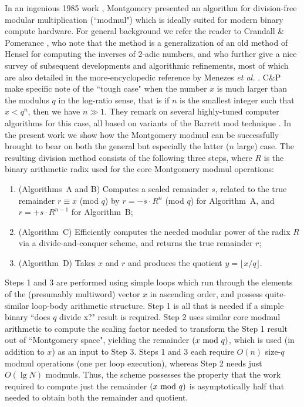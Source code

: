 \documentclass{article}
\begin{document}
In an ingenious 1985 work \cite{Mont85}, Montgomery presented an algorithm for division-free modular multiplication (``modmul") which is ideally suited for modern binary compute hardware. For general background we refer the reader to Crandall \& Pomerance \cite{CP05}, who note that the method is a generalization of an old method of Hensel \cite{Hensel} for computing the inverses of 2-adic numbers, and who further give a nice survey of subsequent developments and algorithmic refinements, most of which are also detailed in the more-encyclopedic reference by Menezes {\em et al.} \cite{Mene96}. C\&P make specific note of the ``tough case" when the number $x$ is much larger than the modulus $q$ in the log-ratio sense, that is if $n$ is the smallest integer such that $x < q^n$, then we have $n \gg 1$. They remark on several highly-tuned computer algorithms for this case, all based on variants of the Barrett mod technique \cite{Bar87}. In the present work we show how the Montgomery modmul can be successfully brought to bear on both the general but especially the latter ($n$ large) case. The resulting division method consists of the following three steps, where $R$ is the binary arithmetic radix used for the core Montgomery modmul operations:
\begin{enumerate}
\item 	(Algorithms~A and B) Computes a scaled remainder $s$, related to the true remainder $r \equiv x$ (mod $q$) by $r = -s \cdot R^n$ (mod $q$) for Algorithm~A, and $r = +s \cdot R^{n-1}$ for Algorithm~B;

\item	(Algorithm~C) Efficiently computes the needed modular power of the radix $R$ via a divide-and-conquer scheme, and returns the true remainder $r$;

\item	(Algorithm~D) Takes $x$ and $r$ and produces the quotient $y = \lfloor x/q \rfloor$.
\end{enumerate}
Steps 1 and 3 are performed using simple loops which run through the elements of the (presumably multiword) vector $x$ in ascending order, and possess quite-similar loop-body arithmetic structure. Step 1 is all that is needed if a simple binary ``does $q$ divide x?" result is required. Step 2 uses similar core modmul arithmetic to compute the scaling factor needed to transform the Step 1 result out of ``Montgomery space", yielding the remainder $(x\ {\rm mod}\ q)$, which is used (in addition to $x$) as an input to Step 3. Steps 1 and 3 each require $O(n)$ size-$q$ modmul operations (one per loop execution), whereas Step 2 needs just $O(\lg N)$ modmuls. Thus, the scheme possesses the property that the work required to compute just the remainder $(x\ {\rm mod}\ q)$ is asymptotically half that needed to obtain both the remainder and quotient.
\end{document}
